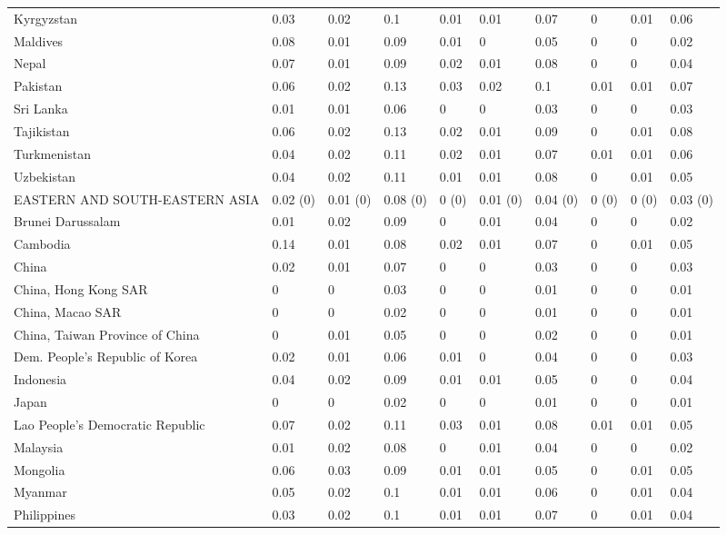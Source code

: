 \begin{longtable}[t]{llllllllll}
Kyrgyzstan & 0.03 & 0.02 & 0.1 & 0.01 & 0.01 & 0.07 & 0 & 0.01 & 0.06\\
Maldives & 0.08 & 0.01 & 0.09 & 0.01 & 0 & 0.05 & 0 & 0 & 0.02\\
Nepal & 0.07 & 0.01 & 0.09 & 0.02 & 0.01 & 0.08 & 0 & 0 & 0.04\\
Pakistan & 0.06 & 0.02 & 0.13 & 0.03 & 0.02 & 0.1 & 0.01 & 0.01 & 0.07\\
Sri Lanka & 0.01 & 0.01 & 0.06 & 0 & 0 & 0.03 & 0 & 0 & 0.03\\
Tajikistan & 0.06 & 0.02 & 0.13 & 0.02 & 0.01 & 0.09 & 0 & 0.01 & 0.08\\
Turkmenistan & 0.04 & 0.02 & 0.11 & 0.02 & 0.01 & 0.07 & 0.01 & 0.01 & 0.06\\
Uzbekistan & 0.04 & 0.02 & 0.11 & 0.01 & 0.01 & 0.08 & 0 & 0.01 & 0.05\\
EASTERN AND SOUTH-EASTERN ASIA & 0.02 (0) & 0.01 (0) & 0.08 (0) & 0 (0) & 0.01 (0) & 0.04 (0) & 0 (0) & 0 (0) & 0.03 (0)\\
Brunei Darussalam & 0.01 & 0.02 & 0.09 & 0 & 0.01 & 0.04 & 0 & 0 & 0.02\\
Cambodia & 0.14 & 0.01 & 0.08 & 0.02 & 0.01 & 0.07 & 0 & 0.01 & 0.05\\
China & 0.02 & 0.01 & 0.07 & 0 & 0 & 0.03 & 0 & 0 & 0.03\\
China, Hong Kong SAR & 0 & 0 & 0.03 & 0 & 0 & 0.01 & 0 & 0 & 0.01\\
China, Macao SAR & 0 & 0 & 0.02 & 0 & 0 & 0.01 & 0 & 0 & 0.01\\
China, Taiwan Province of China & 0 & 0.01 & 0.05 & 0 & 0 & 0.02 & 0 & 0 & 0.01\\
Dem. People's Republic of Korea & 0.02 & 0.01 & 0.06 & 0.01 & 0 & 0.04 & 0 & 0 & 0.03\\
Indonesia & 0.04 & 0.02 & 0.09 & 0.01 & 0.01 & 0.05 & 0 & 0 & 0.04\\
Japan & 0 & 0 & 0.02 & 0 & 0 & 0.01 & 0 & 0 & 0.01\\
Lao People's Democratic Republic & 0.07 & 0.02 & 0.11 & 0.03 & 0.01 & 0.08 & 0.01 & 0.01 & 0.05\\
Malaysia & 0.01 & 0.02 & 0.08 & 0 & 0.01 & 0.04 & 0 & 0 & 0.02\\
Mongolia & 0.06 & 0.03 & 0.09 & 0.01 & 0.01 & 0.05 & 0 & 0.01 & 0.05\\
Myanmar & 0.05 & 0.02 & 0.1 & 0.01 & 0.01 & 0.06 & 0 & 0.01 & 0.04\\
Philippines & 0.03 & 0.02 & 0.1 & 0.01 & 0.01 & 0.07 & 0 & 0.01 & 0.04\\

\end{longtable}

